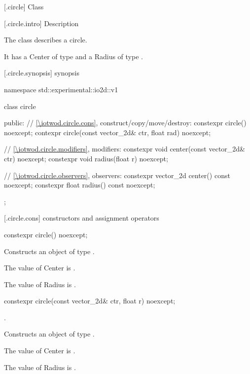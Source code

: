  [\iotwod.circle] {Class }

 [\iotwod.circle.intro] { Description}

\pnum
{}%
The class  describes a circle.

\pnum
It has a Center of type  and a Radius of type .

 [\iotwod.circle.synopsis] { synopsis}

\begin{codeblock}
namespace std::experimental::io2d::v1 {
  class circle {
  public:
    // \ref{\iotwod.circle.cons}, construct/copy/move/destroy:
    constexpr circle() noexcept;
    contexpr circle(const vector_2d& ctr, float rad) noexcept;

    // \ref{\iotwod.circle.modifiers}, modifiers:
    constexpr void center(const vector_2d& ctr) noexcept;
    constexpr void radius(float r) noexcept;
    
    // \ref{\iotwod.circle.observers}, observers:
    constexpr vector_2d center() const noexcept;
    constexpr float radius() const noexcept;
  };
}
\end{codeblock}

 [\iotwod.circle.cons] { constructors and assignment operators}

%
\begin{itemdecl}
constexpr circle() noexcept;
\end{itemdecl}
\begin{itemdescr}
\pnum
\effects
Constructs an object of type .

\pnum
The value of Center is .

\pnum
The value of Radius is .
\end{itemdescr}

%
\begin{itemdecl}
constexpr circle(const vector_2d& ctr, float r) noexcept;
\end{itemdecl}
\begin{itemdescr}
\requires
{}.

\pnum
\effects
Constructs an object of type .

\pnum
The value of Center is .

\pnum
The value of Radius is .
\end{itemdescr}

